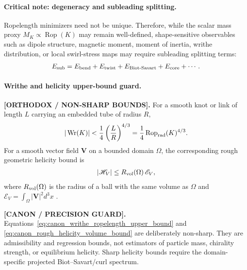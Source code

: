 \documentclass[11pt]{article}
\theoremstyle{definition}
\theoremstyle{plain}
\theoremstyle{remark}
\begin{document}
        \paragraph{Critical note: degeneracy and subleading splitting.}
        Ropelength minimizers need not be unique.  Therefore, while the scalar
        mass proxy \(M_K\propto\operatorname{Rop}(K)\) may remain well-defined,
        shape-sensitive observables such as dipole structure, magnetic moment,
        moment of inertia, writhe distribution, or local swirl-stress maps may
        require subleading splitting terms:
        \begin{align}
            E_{\rm sub}
            =
            E_{\rm bend}
            +
            E_{\rm twist}
            +
            E_{\rm Biot\text{-}Savart}
            +
            E_{\rm core}
            +
            \cdots .
        \end{align}

\paragraph{Writhe and helicity upper-bound guard.}
        \textbf{[ORTHODOX / NON-SHARP BOUNDS].}
        For a smooth knot or link of length \(L\) carrying an embedded tube of
        radius \(R\),
        \begin{align}
            |\operatorname{Wr}(K)|
            <
            \frac14\left(\frac{L}{R}\right)^{4/3}
            =
            \frac14\operatorname{Rop}_{\rm rad}(K)^{4/3}.
            \label{eq:canon_writhe_ropelength_upper_bound}
        \end{align}
        For a smooth vector field \(\mathbf V\) on a bounded domain \(\Omega\),
        the corresponding rough geometric helicity bound is
        \begin{align}
            |\mathscr H_V|
            \leq
            R_{\rm vol}(\Omega)\,\mathscr E_V,
            \label{eq:canon_rough_helicity_volume_bound}
        \end{align}
        where \(R_{\rm vol}(\Omega)\) is the radius of a ball with the same volume
        as \(\Omega\) and \(\mathscr E_V=\int_\Omega|\mathbf V|^2d^3x\)
        \cite{CantarellaDeTurckGluck2001UpperBounds}.

        \textbf{[CANON / PRECISION GUARD].}
        Equations~\eqref{eq:canon_writhe_ropelength_upper_bound} and
        \eqref{eq:canon_rough_helicity_volume_bound} are deliberately non-sharp.
        They are admissibility and regression bounds, not estimators of particle
        mass, chirality strength, or equilibrium helicity.  Sharp helicity bounds
        require the domain-specific projected Biot--Savart/curl spectrum.
\end{document}
